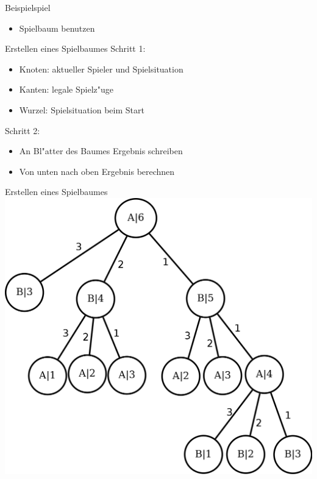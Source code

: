 \documentclass[18pt]{beamer}
\begin{document}
\begin{frame}{Beispielspiel}
\begin{itemize}
\begin{block}{simples Beispielspiel}
Alice und Bob haben sechs M"unzen in der Mitte liegen und nehmen abwechselnd je eine bis drei davon. Wer die letzte M"unze nimmt, gewinnt.
\end{block}
\item Spielbaum benutzen
\end{itemize}
\end{frame}

\begin{frame}{Erstellen eines Spielbaumes}
Schritt 1:
\begin{itemize}
\item Knoten: aktueller Spieler und Spielsituation
\item Kanten: legale Spielz"uge
\item Wurzel: Spielsituation beim Start
\end{itemize}
\pause
Schritt 2:
\begin{itemize}
\item An Bl"atter des Baumes Ergebnis schreiben
\item Von unten nach oben Ergebnis berechnen
\end{itemize}
\end{frame}

\begin{frame}{Erstellen eines Spielbaumes}
\includegraphics[scale=0.55]{baum0.png}
\end{frame}
\end{document}
